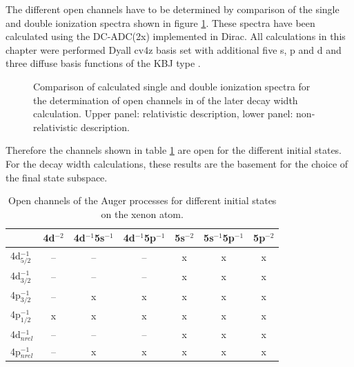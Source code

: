 The different open channels have to be determined by comparison of the single
and double ionization spectra shown in figure \ref{figure:Xe_sdip}.
These spectra have been calculated using the
DC-ADC(2x) implemented in Dirac\cite{Pernpointner04_1,Pernpointner10_1,DIRAC13}.
All calculations in this chapter were performed 
Dyall cv4z basis set\cite{dyall5p06} with additional five s, p and d
and three diffuse basis functions                       
of the \ac{KBJ} type \cite{Kaufmann89}.

\begin{figure}[h]
  \centering
  
  
  \caption{Comparison of calculated single and double ionization spectra
           for the determination of open channels in of the later decay
           width calculation. Upper panel: relativistic description, lower
           panel: non-relativistic description.
           }
  \label{figure:Xe_sdip}
\end{figure}
\afterpage{\clearpage}


Therefore the channels shown in table \ref{table:Xe_open_channels} are
open for the different initial states. For the decay width calculations, these
results are the basement for the choice of the final state subspace.
\begin{table}[h]
  \centering
  \caption{Open channels of the Auger processes for different initial states
           on the xenon atom.}
  \begin{tabular}{lcccccc}
   \toprule
                   & 4d$^{-2}$ & 4d$^{-1}$5s$^{-1}$ & 4d$^{-1}$5p$^{-1}$ & 5s$^{-2}$ & 5s$^{-1}$5p$^{-1}$ & 5p$^{-2}$ \\
   \midrule
   4d$_{5/2}^{-1}$ &      --   &       --           &        --          &     x     &     x              &     x     \\
   4d$_{3/2}^{-1}$ &      --   &       --           &        --          &     x     &     x              &     x     \\
   4p$_{3/2}^{-1}$ &      --   &        x           &         x          &     x     &     x              &     x     \\
   4p$_{1/2}^{-1}$ &       x   &        x           &         x          &     x     &     x              &     x     \\
   \midrule
   4d$^{-1}_{nrel}$&      --   &       --           &        --          &     x     &     x              &     x     \\
   4p$^{-1}_{nrel}$&      --   &        x           &         x          &     x     &     x              &     x     \\
   \bottomrule
  \end{tabular}
  \label{table:Xe_open_channels}
\end{table}




